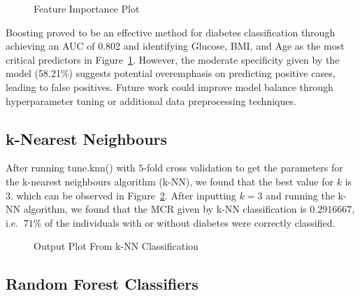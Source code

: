 \documentclass[12pt]{article}
\begin{document}
\begin{figure}[h!]
	\centering
 	\caption{Feature Importance Plot}
 	\label{fig:importance}
\end{figure}

Boosting proved to be an effective method for diabetes classification through achieving an AUC of 0.802 and identifying Glucose, BMI, and Age as the most critical predictors in Figure~\ref{fig:importance}. However, the moderate specificity given by the model (58.21\%) suggests potential overemphasis on predicting positive cases, leading to false positives. Future work could improve model balance through hyperparameter tuning or additional data preprocessing techniques.

\subsection{k-Nearest Neighbours}

\indent
\onehalfspacing

After running tune.knn() with $5$-fold cross validation to get the parameters for the k-nearest neighbours algorithm (k-NN), we found that the best value for $k$ is $3$. which can be observed in Figure~\ref{fig:KNNPlot}. After inputting $k=3$ and running the k-NN algorithm, we found that the MCR given by k-NN classification is $0.2916667$, i.e. $~71\%$ of the individuals with or without diabetes were correctly classified.

 \begin{figure}[h!]
 	\centering
 	\caption{Output Plot From k-NN Classification} 
 	\label{fig:KNNPlot}
 \end{figure}

\subsection{Random Forest Classifiers}
\end{document}
